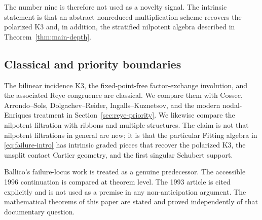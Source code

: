 The number nine is therefore not used as a novelty signal.  The
intrinsic statement is that an abstract nonreduced multiplication
scheme recovers the polarized K3 and, in addition, the stratified
nilpotent algebra described in Theorem~\ref{thm:main-depth}.

\subsection*{Classical and priority boundaries}

The bilinear incidence K3, the fixed-point-free factor-exchange
involution, and the associated Reye congruence are classical.  We
compare them with Cossec, Arrondo--Sols, Dolgachev--Reider,
Ingalls--Kuznetsov, and the modern nodal-Enriques treatment in
Section~\ref{sec:reye-priority}.  We likewise compare the nilpotent
filtration with ribbons and multiple structures.  The claim is not
that nilpotent filtrations in general are new; it is that the
particular Fitting algebra in \eqref{eq:failure-intro} has intrinsic
graded pieces that recover the polarized K3, the unsplit contact
Cartier geometry, and the first singular Schubert support.

Ballico's failure-locus work is treated as a genuine predecessor.
The accessible 1996 continuation is compared at theorem level.  The
1993 article is cited explicitly and is not used as a premise in any
non-anticipation argument.  The mathematical theorems of this paper
are stated and proved independently of that documentary question.
